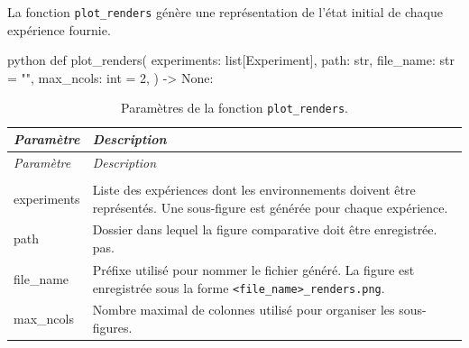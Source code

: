 \noindent La fonction \texttt{plot\_renders} génère une représentation de l'état initial de chaque expérience fournie.

\begin{codebox}{python}
def plot_renders(
    experiments: list[Experiment],
    path: str,
    file_name: str = "",
    max_ncols: int = 2,
) -> None:
\end{codebox}


\begin{longtable}{
        >{\ttfamily\small}p{}
        p{}
    }
    \caption{Paramètres de la fonction \texttt{plot\_renders}.}
    \label{tab:plot_renders_parameters}                                                                                                                           \\

    \toprule
    \textnormal{\textit{Paramètre}} &

    \textit{Description}                                                                                                                                          \\
    \midrule
    \endfirsthead

    \toprule
    \textnormal{\textit{Paramètre}} &

    \textit{Description}                                                                                                                                          \\
    \midrule
    \endhead

    \midrule
    \\
    \endfoot

    \bottomrule
    \endlastfoot

    experiments

                                    & Liste des expériences dont les environnements doivent être représentés. Une sous-figure est générée pour chaque expérience. \\

    path

                                    & Dossier dans lequel la figure comparative doit être enregistrée. pas.                                                       \\

    file\_name

                                    & Préfixe utilisé pour nommer le fichier généré. La figure est enregistrée sous la forme \texttt{<file\_name>\_renders.png}.  \\

    max\_ncols

                                    & Nombre maximal de colonnes utilisé pour organiser les sous-figures.                                                         \\
\end{longtable}

